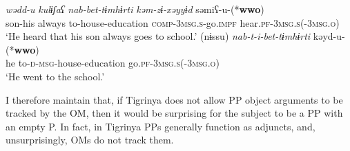 \documentclass[output=paper]{langscibook}
\begin{document}
\ea\label{ex:Gebregziabher:cp1} 
 \ea
 \gll \textit{wədd-u} \textit{kulɨʃaʕ} \textit{nab-bet-tɨmhɨrti} \textit{kəm-zɨ-xəyyɨd} səmiʕ-u-(*{\textbf{wwo}})\\
 son-his always to-house-education {\scshape comp-3msg.s-}go.{\scshape impf} hear.{\scshape pf-3msg.s(-3msg.o)}\\
 \glt `He heard that his son always goes to school.' 
 \ex\label{ex:Gebregziabher:cp2}
 \gll (nɨssu) \textit{nab-t-i-bet-tɨmhɨrti} kəyd-u-(*{\textbf{wwo}})\\
 he to-{\scshape d-msg}-house-education go.{\scshape pf-3msg.s(-3msg.o)}\\
 \glt `He went to the school.'
\z
\ex\label{ex:Gebregziabher:pp-1}
\z
\z
 
\noindent I therefore maintain that, if Tigrinya does not allow PP object arguments to be tracked by the OM, then it would be surprising for the subject to be a PP with an empty P. In fact, in Tigrinya PPs generally function as adjuncts, and, unsurprisingly, OMs do not track them.
\end{document}
